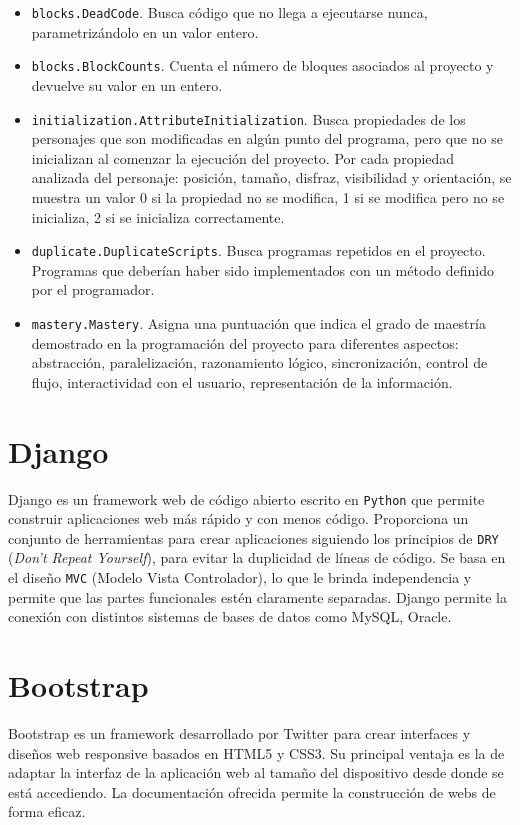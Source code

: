 \documentclass[a4paper, 12pt]{book}
\begin{document}
\begin{itemize}
  \item \texttt{blocks.DeadCode}.
  Busca código que no llega a ejecutarse nunca, parametrizándolo en un valor entero.
  \item \texttt{blocks.BlockCounts}.
  Cuenta el número de bloques asociados al proyecto y devuelve su valor en un entero.
  \item \texttt{initialization.AttributeInitialization}.
  Busca propiedades de los personajes que son modificadas en algún punto del programa,
  pero que no se inicializan al comenzar la 	ejecución del proyecto. Por cada propiedad
  analizada del personaje: posición, tamaño, 	disfraz, visibilidad y orientación, se
  muestra un valor 0 si la propiedad no se modifica, 	1 si se modifica pero no se inicializa,
  2 si se inicializa correctamente.
  \item \texttt{duplicate.DuplicateScripts}.
  Busca programas repetidos en el proyecto. Programas que deberían haber sido implementados
  con un método definido por el programador.
  \item \texttt{mastery.Mastery}.
  Asigna una puntuación que indica el grado de maestría demostrado en la programación del
  proyecto para diferentes aspectos: abstracción, paralelización, razonamiento lógico,
  sincronización, control de flujo, interactividad con el usuario, representación de la información.
	
	
\end{itemize}


\section{Django}
\label{sec:seccion4}
Django es un framework web de código abierto escrito en \texttt{Python} que permite construir aplicaciones
web más rápido y con menos código. Proporciona un conjunto de herramientas para crear aplicaciones
siguiendo los principios de \texttt{DRY} (\emph{Don't Repeat Yourself}), para evitar la duplicidad de líneas de código.
Se basa en el diseño \texttt{MVC} (Modelo Vista Controlador), lo que le brinda independencia y permite que
las partes funcionales estén claramente separadas.
Django permite la conexión con distintos sistemas de bases de datos como MySQL, Oracle.



\section{Bootstrap}
\label{sec:seccion5}
Bootstrap es un framework desarrollado por Twitter para crear interfaces y diseños web responsive
basados en HTML5 y CSS3. Su principal ventaja es la de adaptar la interfaz de la aplicación web
al tamaño del dispositivo desde donde se está accediendo. La documentación ofrecida permite la
construcción de webs de forma eficaz.
\end{document}
